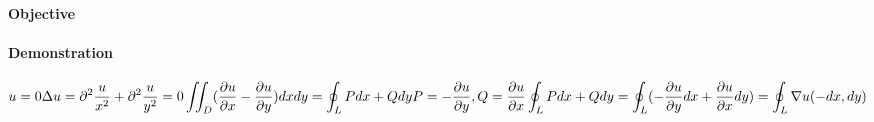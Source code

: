 

\paragraph{Objective}

\paragraph{Demonstration}

\[u=0\\
\Delta u=\partial^2\frac{u}{x^2}+\partial^2\frac{u}{y^2}=0\\
\iint_{D}(\frac{\partial u}{\partial x}-\frac{\partial u}{\partial y})dxdy=\oint_{L}Pdx+Qdy\\
P=-\frac{\partial u}{\partial y},Q=\frac{\partial u}{\partial x}\\
\oint_{L}Pdx+Qdy=\oint_{L}(-\frac{\partial u}{\partial y}dx+\frac{\partial u}{\partial x}dy)=\oint_{L}\nabla u(-dx,dy)
\]